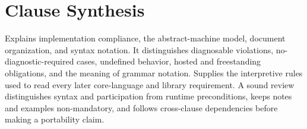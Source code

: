 \documentclass[11pt,letterpaper]{article}
\begin{document}
\section{Clause Synthesis}
\begin{CornellReferenceOrientationBox}Explains implementation compliance, the abstract-machine model, document organization, and syntax notation. It distinguishes diagnosable violations, no-diagnostic-required cases, undefined behavior, hosted and freestanding obligations, and the meaning of grammar notation. Supplies the interpretive rules used to read every later core-language and library requirement. A sound review distinguishes syntax and participation from runtime preconditions, keeps notes and examples non-mandatory, and follows cross-clause dependencies before making a portability claim.\end{CornellReferenceOrientationBox}
\end{document}
